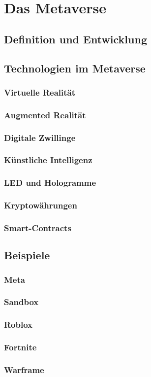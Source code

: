 \chapter{Das Metaverse}\label{ch:Metaverse}

\section{Definition und Entwicklung} %
\section{Technologien im Metaverse}

\subsection{Virtuelle Realität}
\subsection{Augmented Realität}
\subsection{Digitale Zwillinge}
\subsection{Künstliche Intelligenz}
\subsection{LED und Hologramme}
\subsection{Kryptowährungen}
\subsection{Smart-Contracts}

\section{Beispiele}

\subsection{Meta}
\subsection{Sandbox}
\subsection{Roblox}
\subsection{Fortnite}
\subsection{Warframe}